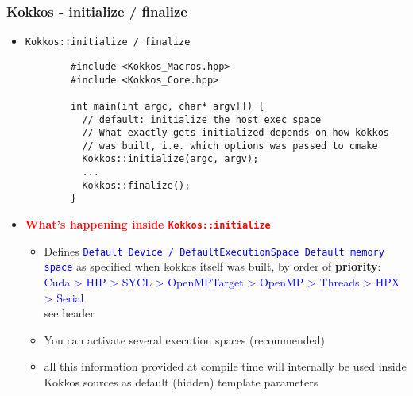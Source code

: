 
\begin{frame}[fragile=singleslide]
  \frametitle{Kokkos - initialize / finalize}

  \begin{itemize}
  \item \texttt{Kokkos::initialize / finalize}
    {\small\begin{verbatim}
        #include <Kokkos_Macros.hpp>
        #include <Kokkos_Core.hpp>

        int main(int argc, char* argv[]) {
          // default: initialize the host exec space
          // What exactly gets initialized depends on how kokkos
          // was built, i.e. which options was passed to cmake
          Kokkos::initialize(argc, argv);
          ...
          Kokkos::finalize();
        }
      \end{verbatim}
    }
  \item \textcolor{red}{\textbf{What's happening inside \texttt{Kokkos::initialize}}}
    \begin{itemize}
    \item Defines \textcolor{blue}{\texttt{Default Device / DefaultExecutionSpace Default memory space}} as specified when kokkos itself was built, by order of {\bf priority}:\\
       \textcolor{blue}{Cuda > HIP > SYCL > OpenMPTarget > OpenMP > Threads > HPX > Serial}\\
      see header 
    \item You can activate several execution spaces (recommended)
    \item all this information provided at compile time will internally be used inside Kokkos sources as default (hidden) template parameters
    \end{itemize}
  \end{itemize}
\end{frame}

